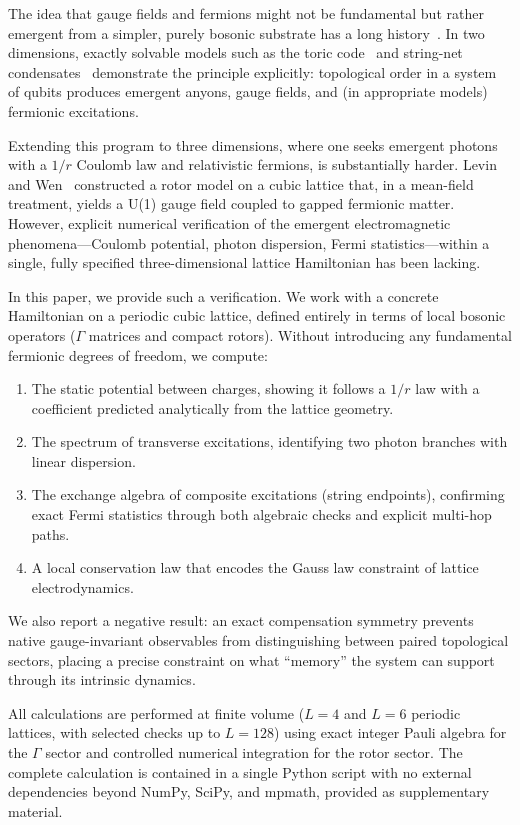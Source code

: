 \documentclass[aps,prb,twocolumn,superscriptaddress,showpacs]{revtex4-2}
\begin{document}
The idea that gauge fields and fermions might not be fundamental but rather
emergent from a simpler, purely bosonic substrate has a long
history~\cite{levin2003,levin2006,wen2003order,kitaev2003}. In two
dimensions, exactly solvable models such as the toric code~\cite{kitaev2003}
and string-net condensates~\cite{levin2005} demonstrate the principle
explicitly: topological order in a system of qubits produces emergent
anyons, gauge fields, and (in appropriate models) fermionic excitations.

Extending this program to three dimensions, where one seeks emergent photons
with a $1/r$ Coulomb law and relativistic fermions, is substantially harder.
Levin and Wen~\cite{levin2006} constructed a rotor model on a cubic lattice
that, in a mean-field treatment, yields a U(1) gauge field coupled to gapped
fermionic matter. However, explicit numerical verification of the emergent
electromagnetic phenomena---Coulomb potential, photon dispersion, Fermi
statistics---within a single, fully specified three-dimensional lattice
Hamiltonian has been lacking.

In this paper, we provide such a verification. We work with a concrete
Hamiltonian on a periodic cubic lattice, defined entirely in terms of local
bosonic operators ($\Gamma$ matrices and compact rotors). Without introducing
any fundamental fermionic degrees of freedom, we compute:
\begin{enumerate}
\item The static potential between charges, showing it follows a $1/r$ law
with a coefficient predicted analytically from the lattice geometry.
\item The spectrum of transverse excitations, identifying two photon branches
with linear dispersion.
\item The exchange algebra of composite excitations (string endpoints),
confirming exact Fermi statistics through both algebraic checks and
explicit multi-hop paths.
\item A local conservation law that encodes the Gauss law constraint of
lattice electrodynamics.
\end{enumerate}
We also report a negative result: an exact compensation symmetry prevents
native gauge-invariant observables from distinguishing between paired
topological sectors, placing a precise constraint on what ``memory'' the
system can support through its intrinsic dynamics.

All calculations are performed at finite volume ($L=4$ and $L=6$ periodic
lattices, with selected checks up to $L=128$) using exact integer Pauli
algebra for the $\Gamma$ sector and controlled numerical integration for the
rotor sector. The complete calculation is contained in a single Python script
with no external dependencies beyond NumPy, SciPy, and mpmath, provided as
supplementary material.
\end{document}
